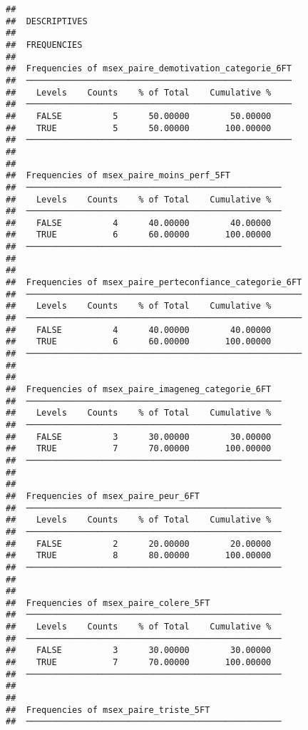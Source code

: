 \documentclass[
]{article}
\begin{document}
\begin{verbatim}
## 
##  DESCRIPTIVES
## 
##  FREQUENCIES
## 
##  Frequencies of msex_paire_demotivation_categorie_6FT 
##  ──────────────────────────────────────────────────── 
##    Levels    Counts    % of Total    Cumulative %   
##  ──────────────────────────────────────────────────── 
##    FALSE          5      50.00000        50.00000   
##    TRUE           5      50.00000       100.00000   
##  ──────────────────────────────────────────────────── 
## 
## 
##  Frequencies of msex_paire_moins_perf_5FT           
##  ────────────────────────────────────────────────── 
##    Levels    Counts    % of Total    Cumulative %   
##  ────────────────────────────────────────────────── 
##    FALSE          4      40.00000        40.00000   
##    TRUE           6      60.00000       100.00000   
##  ────────────────────────────────────────────────── 
## 
## 
##  Frequencies of msex_paire_perteconfiance_categorie_6FT 
##  ────────────────────────────────────────────────────── 
##    Levels    Counts    % of Total    Cumulative %   
##  ────────────────────────────────────────────────────── 
##    FALSE          4      40.00000        40.00000   
##    TRUE           6      60.00000       100.00000   
##  ────────────────────────────────────────────────────── 
## 
## 
##  Frequencies of msex_paire_imageneg_categorie_6FT   
##  ────────────────────────────────────────────────── 
##    Levels    Counts    % of Total    Cumulative %   
##  ────────────────────────────────────────────────── 
##    FALSE          3      30.00000        30.00000   
##    TRUE           7      70.00000       100.00000   
##  ────────────────────────────────────────────────── 
## 
## 
##  Frequencies of msex_paire_peur_6FT                 
##  ────────────────────────────────────────────────── 
##    Levels    Counts    % of Total    Cumulative %   
##  ────────────────────────────────────────────────── 
##    FALSE          2      20.00000        20.00000   
##    TRUE           8      80.00000       100.00000   
##  ────────────────────────────────────────────────── 
## 
## 
##  Frequencies of msex_paire_colere_5FT               
##  ────────────────────────────────────────────────── 
##    Levels    Counts    % of Total    Cumulative %   
##  ────────────────────────────────────────────────── 
##    FALSE          3      30.00000        30.00000   
##    TRUE           7      70.00000       100.00000   
##  ────────────────────────────────────────────────── 
## 
## 
##  Frequencies of msex_paire_triste_5FT               
##  ────────────────────────────────────────────────── 

\end{verbatim}
\end{document}
